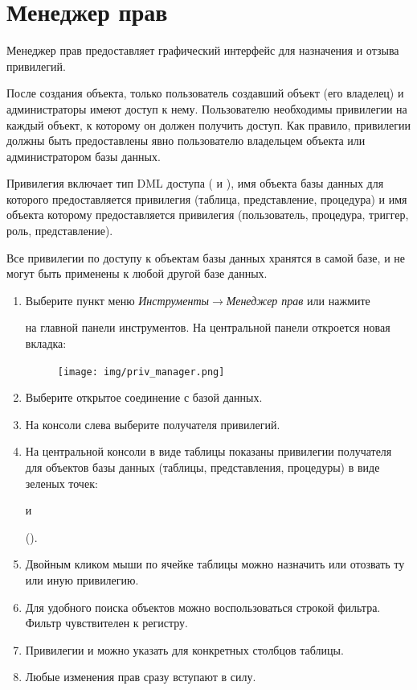 \newpage

\section{Менеджер прав}\label{sec:priv_manager}
Менеджер прав предоставляет графический интерфейс для назначения и отзыва привилегий.

После создания объекта, только пользователь создавший объект (его владелец) и администраторы имеют доступ к нему. Пользователю необходимы привилегии на каждый объект, к которому он должен получить доступ. Как правило, привилегии должны быть предоставлены явно пользователю владельцем объекта или администратором базы данных.

Привилегия включает тип DML доступа ( и ), имя объекта базы данных для которого предоставляется привилегия (таблица, представление, процедура) и имя объекта которому  предоставляется привилегия (пользователь, процедура, триггер, роль, представление). 

Все привилегии по доступу к объектам базы данных хранятся в самой базе, и не могут быть применены к любой другой базе данных.

\begin{enumerate}[leftmargin=39pt]
	\item Выберите пункт меню \textit{Инструменты}$\rightarrow$\textit{Менеджер прав} или нажмите  на главной панели инструментов. На центральной панели откроется новая вкладка:
	\begin{figure}[H]
		\flushright
		\texttt{[image: img/priv\_manager.png]}
	\end{figure}
	\item Выберите открытое соединение с базой данных.
	\item На консоли слева выберите получателя привилегий.
	\item На центральной консоли в виде таблицы показаны привилегии получателя для объектов базы данных (таблицы, представления, процедуры) в виде зеленых точек:  и  ().
	\item Двойным кликом мыши по ячейке таблицы можно назначить или отозвать ту или иную привилегию.
	\item Для удобного поиска объектов можно воспользоваться строкой фильтра. Фильтр чувствителен к регистру.
	\item Привилегии  и  можно указать для конкретных столбцов таблицы.
	\item Любые изменения прав сразу вступают в силу.
\end{enumerate}	

